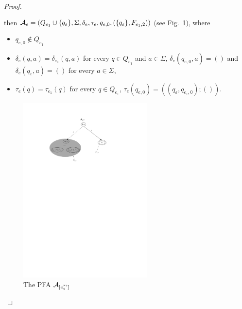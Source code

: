 \begin{proof}
\begin{itemize}
            then $\mathcal{A}_e = (Q_{e_1} \cup \{q_{\varepsilon}\}, \Sigma,
            \delta_e, \tau_e, q_{e,0}, (\{q_{\varepsilon}\}, F_{e_1,2}))$ (see Fig.~\ref{fig-reg2pfa-7}), where 
            \begin{itemize}
                \item $q_{e,0}  \not \in Q_{e_1}$
                \item $\delta_e(q, a) = \delta_{e_1}(q, a)$ for every $q \in Q_{e_1}$ and $a \in \Sigma$, $\delta_e(q_{e,0}, a)  = ()$ and $\delta_e(q_{\varepsilon}, a) = ()$ for every $a \in \Sigma$, 
                \item $\tau_e(q) = \tau_{e_1}(q)$ for every $q \in Q_{e_1}$, $\tau_e(q_{e,0}) = ((q_{\varepsilon}, q_{e_1,0}); ())$.
            \end{itemize}
            \begin{figure}[ht]
                \centering
                \includegraphics[width = 0.6\textwidth]{reg2pfa-7.pdf}
                \caption{The PFA $\mathcal{A}_{[e_1^{??}]}$}
                \label{fig-reg2pfa-7}
            \end{figure}


\end{itemize}
\end{proof}
